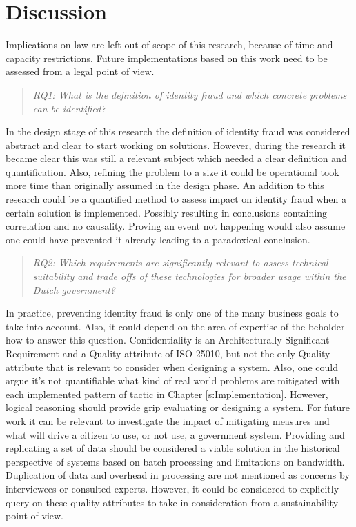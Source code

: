 \chapter{Discussion}\label{s:discussion}
Implications on law are left out of scope of this research, because of time and capacity restrictions. Future implementations based on this work need to be assessed from a legal point of view.

\begin{quote}\emph{RQ1: What is the definition of identity fraud and which concrete problems can be identified?}\end{quote}
In the design stage of this research the definition of identity fraud was considered abstract and clear to start working on solutions. However, during the research it became clear this was still a relevant subject which needed a clear definition and quantification. Also, refining the problem to a size it could be operational took more time than originally assumed in the design phase. An addition to this research could be a quantified method to assess impact on identity fraud when a certain solution is implemented. Possibly resulting in conclusions containing correlation and no causality. Proving an event not happening would also assume one could have prevented it already leading to a paradoxical conclusion.

\begin{quote}\emph{RQ2: Which requirements are significantly relevant to assess technical suitability and trade offs of these technologies for broader usage within the Dutch government?}\end{quote}
In practice, preventing identity fraud is only one of the many business goals to take into account. Also, it could depend on the area of expertise of the beholder how to answer this question. Confidentiality is an Architecturally Significant Requirement and a Quality attribute of ISO 25010, but not the only Quality attribute that is relevant to consider when designing a system. Also, one could argue it's not quantifiable what kind of real world problems are mitigated with each implemented pattern of tactic in Chapter \ref{s:Implementation}. However, logical reasoning should provide grip evaluating or designing a system. For future work it can be relevant to investigate the impact of mitigating measures and what will drive a citizen to use, or not use, a government system. Providing and replicating a set of data should be considered a viable solution in the historical perspective of systems based on batch processing and limitations on bandwidth. Duplication of data and overhead in processing are not mentioned as concerns by interviewees or consulted experts. However, it could be considered to explicitly query on these quality attributes to take in consideration from a sustainability point of view.


